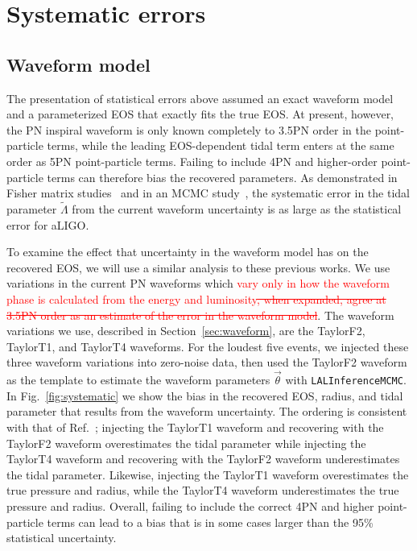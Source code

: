 \documentclass[twocolumn,prd,amssymb,aps,nofootinbib,showpacs,epsf]{revtex4}
\newcommand\ben[2]{\textcolor{red}{{#1}\sout{#2}}}
\begin{document}
\section{Systematic errors}
\label{sec:systematic}


\subsection{Waveform model}

The presentation of statistical errors above assumed an exact waveform model and a parameterized EOS that exactly fits the true EOS. At present, however, the PN inspiral waveform is only known completely to 3.5PN order in the point-particle terms, while the leading EOS-dependent tidal term enters at the same order as 5PN point-particle terms. Failing to include 4PN and higher-order point-particle terms can therefore bias the recovered parameters. As demonstrated in Fisher matrix studies~\cite{Favata2014, YagiYunes2014} and in an MCMC study~\cite{WadeCreightonOchsner2014}, the systematic error in the tidal parameter $\tilde\Lambda$ from the current waveform uncertainty is as large as the statistical error for aLIGO. 

To examine the effect that uncertainty in the waveform model has on the recovered EOS, we will use a similar analysis to these previous works. We use variations in the current PN waveforms which \ben{vary only in how the waveform phase is calculated from the energy and luminosity}{, when expanded, agree at 3.5PN order as an estimate of the error in the waveform model}. The waveform variations we use, described in Section~\ref{sec:waveform}, are the TaylorF2, TaylorT1, and TaylorT4 waveforms. For the loudest five events, we injected these three waveform variations into zero-noise data, then used the TaylorF2 waveform as the template to estimate the waveform parameters $\vec\theta$ with \texttt{LALInferenceMCMC}. In Fig.~\ref{fig:systematic} we show the bias in the recovered EOS, radius, and tidal parameter that results from the waveform uncertainty. The ordering is consistent with that of Ref.~\cite{WadeCreightonOchsner2014}; injecting the TaylorT1 waveform and recovering with the TaylorF2 waveform overestimates the tidal parameter while injecting the TaylorT4 waveform and recovering with the TaylorF2 waveform underestimates the tidal parameter. Likewise, injecting the TaylorT1 waveform overestimates the true pressure and radius, while the TaylorT4 waveform underestimates the true pressure and radius. Overall, failing to include the correct 4PN and higher point-particle terms can lead to a bias that is in some cases larger than the 95\% statistical uncertainty.
\end{document}
